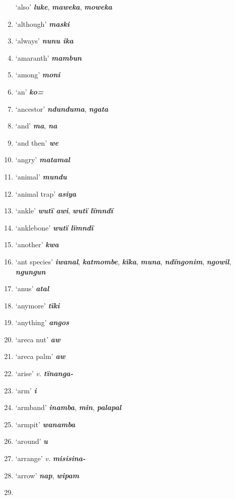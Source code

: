 \begin{enumerate}[noitemsep, label={}, align=left, widest=190, labelsep=1ex,leftmargin=*,itemindent=-10pt]
‘also’ \textbf{\textit{luke}}, \textbf{\textit{maweka}}, \textbf{\textit{moweka}} \item
‘although’ \textbf{\textit{maski}} \item
‘always’ \textbf{\textit{nunu ika}} \item
‘amaranth’ \textbf{\textit{mambun}} \item
‘among’ \textbf{\textit{moni}} \item
‘an’ \textbf{\textit{ko=}} \item
‘ancestor’ \textbf{\textit{ndunduma}}, \textbf{\textit{ngata}} \item
‘and’ \textbf{\textit{ma}}, \textbf{\textit{na}} \item
‘and then’ \textbf{\textit{we}} \item
‘angry’ \textbf{\textit{matamal}} \item
‘animal’ \textbf{\textit{mundu}} \item
‘animal trap’ \textbf{\textit{asiya}} \item
‘ankle’ \textbf{\textit{wutï awi}}, \textbf{\textit{wutï lïmndï}} \item
‘anklebone’ \textbf{\textit{wutï lïmndï}} \item
‘another’ \textbf{\textit{kwa}} \item
‘ant species’ \textbf{\textit{iwanal}}, \textbf{\textit{katmombe}}, \textbf{\textit{kïka}}, \textbf{\textit{muna}}, \textbf{\textit{ndïngonim}}, \textbf{\textit{ngowil}}, \textbf{\textit{ngungun}} \item
‘anus’ \textbf{\textit{atal}} \item
‘anymore’ \textbf{\textit{tïki}} \item
‘anything’ \textbf{\textit{angos}} \item
‘areca nut’ \textbf{\textit{aw}} \item
‘areca palm’ \textbf{\textit{aw}} \item
‘arise’ \textit{v.} \textbf{\textit{tïnanga-}} \item
‘arm’ \textbf{\textit{i}} \item
‘armband’ \textbf{\textit{inamba}}, \textbf{\textit{min}}, \textbf{\textit{palapal}} \item
‘armpit’ \textbf{\textit{wanamba}} \item
‘around’ \textbf{\textit{u}} \item
‘arrange’ \textit{v.} \textbf{\textit{misisina-}} \item
‘arrow’ \textbf{\textit{nap}}, \textbf{\textit{wipam}} \item

\end{enumerate}
